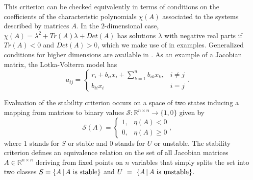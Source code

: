 This criterion can be checked equivalently in terms of conditions on the coefficients of the characteristic polynomials $\chi(A)$ associated to the systems described by matrices $A$. In the $2$-dimensional case, $\chi(A) = \lambda^2 + Tr(A)\lambda+Det(A)$ has solutions $\lambda$ with negative real parts if $Tr(A)<0$ and $Det(A)>0$, which we make use of in examples. Generalized conditions for higher dimensions are available in \cite{Gantmacher1959}. As an example of a Jacobian matrix, the Lotka-Volterra model has
 \begin{equation}\label{eq:lotkavolterrajacobian}
   a_{ij} = \left\{
     \begin{array}{lr}
       r_i + b_{ii} x_i + \sum_{k=1}^{n} b_{ik} x_{k}, & i \neq j\\
       b_{ii} x_i & i=j
     \end{array}.
   \right.
\end{equation}

Evaluation of the stability criterion occurs on a space of two states inducing a mapping from matrices to binary values $\mathcal{S} \colon \mathbb{R}^{n \times n} \rightarrow \{ 1, 0 \}$ given by
 \begin{equation}\label{eq:stabeval}
   \mathcal{S}(A) = \left\{
     \begin{array}{lr}
       1, & \eta (A) < 0\\
       0, & \eta (A) \geq 0
     \end{array},
   \right.
\end{equation}
where $1$ stands for $S$ or stable and $0$ stands for $U$ or unstable. The stability criterion defines an equivalence relation on the set of all Jacobian matrices $A \in \mathbb{R}^{n \times n}$ deriving from fixed points on $n$ variables that simply splits the set into two classes $S=\{ A \, | \, A \hbox{ is stable}  \}$ and $U~=~\{ A \, | \, A \hbox{ is unstable} \}$.

